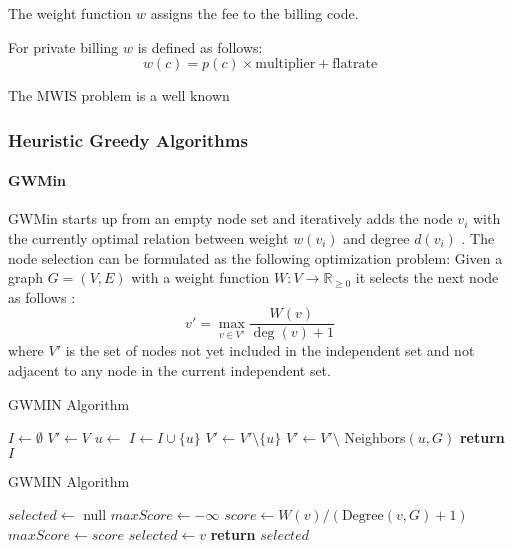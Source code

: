 The weight function $w$ assigns the fee to the billing code.

For private billing $w$ is defined as follows:
\begin{equation}
    w\left(c\right) = p\left(c\right) \times \text{multiplier} + \text{flatrate}\label{eq:fee-function}
\end{equation}


The MWIS problem is a well known

\subsubsection{Heuristic Greedy Algorithms}

\paragraph{GWMin}
GWMin starts up from an empty node set and iteratively adds the node $v_i$ with the currently optimal relation between weight $w(v_i)$ and degree $d(v_i)$ \cite{SAKAI2003313}.
The node selection can be formulated as the following optimization problem:
Given a graph $G = (V, E)$ with a weight function $W: V \to \mathbb{R}_{\geq 0}$ it selects the next node as follows :
\[
    v' = \max_{v \in V'} \frac{W(v)}{\deg(v) + 1}
\]
where $V'$ is the set of nodes not yet included in the independent set and not adjacent to any node in the current independent set.


\begin{algorithm}
    \caption{GWMIN Algorithm}
    \begin{algorithmic}[1]
            \State $I \gets \emptyset$ 
            \State $V' \gets V$ 
                \State $u \gets$ 
                \State $I \gets I \cup \{u\}$ 
                \State $V' \gets V' \setminus \{u\}$ 
                \State $V' \gets V' \setminus$ Neighbors$(u, G)$ 
            \EndWhile
            \State \textbf{return} $I$
        \EndProcedure
    \end{algorithmic}
\end{algorithm}


\begin{algorithm}
    \caption{GWMIN Algorithm}
    \begin{algorithmic}[1]
            \State $selected \gets$ null
            \State $maxScore \gets -\infty$
                \State $score \gets W(v) / (\text{Degree}(v, G) + 1)$
                    \State $maxScore \gets score$
                    \State $selected \gets v$
                \EndIf
            \EndFor
            \State \textbf{return} $selected$
        \EndProcedure
    \end{algorithmic}
\end{algorithm}


